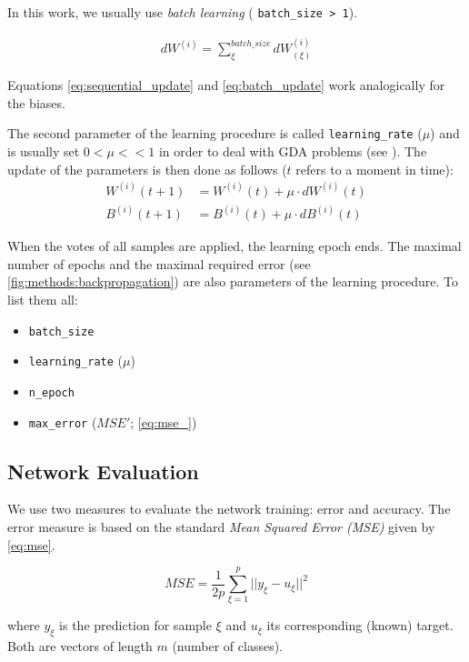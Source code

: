 \begin{enumerate}
In this work, we usually use \textit{batch learning} ( \texttt{batch\_size > 1}).

\begin{align} \label{eq:batch_update}
dW^{(i)} = \displaystyle{\sum_{\xi}^{batch\_size} dW^{(i)}_{(\xi)}}
\end{align}

Equations \ref{eq:sequential_update} and \ref{eq:batch_update} work analogically for the biases.

The second parameter of the learning procedure is called \texttt{learning\_rate} ($ \mu $) and is usually set $ 0 < \mu << 1 $ in order to deal with GDA problems (see \citep{online:nnanddl}). The update of the parameters is then done as follows ($ t $ refers to a moment in time):
\begin{align} \label{eq:params_update}
W^{(i)} (t+1) &= W^{(i)} (t) + \mu \cdot dW^{(i)} (t) \\ 
B^{(i)} (t+1) &= B^{(i)} (t) + \mu \cdot dB^{(i)} (t)
\end{align}
\end{enumerate}

When the votes of all samples are applied, the learning epoch ends. The maximal number of epochs and the maximal required error (see \cref{fig:methods:backpropagation}) are also parameters of the learning procedure. To list them all:

\begin{itemize}
\item \texttt{batch\_size}
\item \texttt{learning\_rate} ($ \mu $)
\item \texttt{n\_epoch}
\item \texttt{max\_error} ($ MSE' $; \cref{eq:mse_})
\end{itemize}

\subsection*{Network Evaluation}
We use two measures to evaluate the network training: error and accuracy.
The error measure is based on the standard \textit{Mean Squared Error (MSE)} given by \cref{eq:mse}.

\begin{equation} \label{eq:mse}
MSE = \frac{1}{2 p} \displaystyle{\sum^{p}_{\xi=1} ||y_{\xi} - u_{\xi}||^2}
\end{equation}

where $ y_{\xi} $ is the prediction for sample $ \xi $ and $ u_{\xi} $ its corresponding (known) target. Both are vectors of length $ m $ (number of classes).

